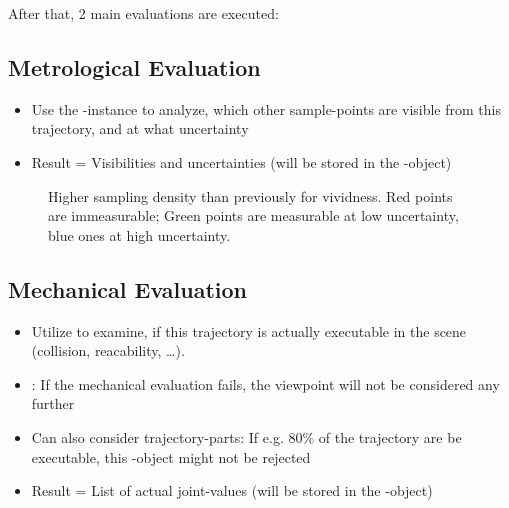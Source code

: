 \documentclass[letterpaper,10pt,english]{sphinxmanual}
\begin{document}
\begin{figure}[htbp]
\centering

\noindent{}
\end{figure}

After that, 2 main evaluations are executed:


\subsection{Metrological Evaluation}
\label{\detokenize{view_planning_detailed:metrological-evaluation}}\begin{itemize}
\item {} 
Use the {\hyperref[\detokenize{module_sensor_model:sensor-model}]{}}-instance to analyze, which other sample-points are visible from this trajectory, and at what uncertainty

\item {} 
Result = Visibilities and uncertainties (will be stored in the {\hyperref[\detokenize{module_view:viewpoint}]{}}-object)

\end{itemize}

\begin{figure}[htbp]
\centering
\capstart

\noindent{}
\caption{Higher sampling density than previously for vividness. Red points are immeasurable; Green points are measurable at low uncertainty, blue ones at high uncertainty.}\label{\detokenize{view_planning_detailed:id3}}\end{figure}


\subsection{Mechanical Evaluation}
\label{\detokenize{view_planning_detailed:mechanical-evaluation}}\begin{itemize}
\item {} 
Utilize  to examine, if this trajectory is actually executable in the scene (collision, reacability, …).

\item {} 
: If the mechanical evaluation fails, the viewpoint will not be considered any further

\item {} 
Can also consider trajectory-parts: If e.g. 80\% of the trajectory are be executable, this {\hyperref[\detokenize{module_view:viewpoint}]{}}-object might not be rejected

\item {} 
Result = List of actual joint-values (will be stored in the {\hyperref[\detokenize{module_view:viewpoint}]{}}-object)

\end{itemize}
\end{document}
